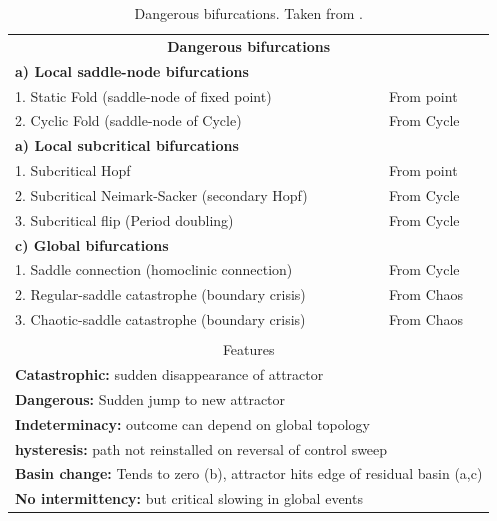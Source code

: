 \begin{table}[H]
				\centering
	\begin{tabular}{ll}
		\hline
		\multicolumn{2}{c}{\textbf{Dangerous bifurcations}} \\
		\textbf{a) Local saddle-node bifurcations} & \\
		1. Static Fold (saddle-node of fixed point) & From point\\
		2. Cyclic Fold (saddle-node of Cycle) & From Cycle\\				
		\textbf{a) Local subcritical bifurcations} & \\
		1. Subcritical Hopf  & From point\\
		2. Subcritical Neimark-Sacker (secondary Hopf)  & From Cycle\\		
		3. Subcritical flip (Period doubling)  & From Cycle\\				
		\textbf{c) Global bifurcations} & \\
		1. Saddle connection (homoclinic connection) &  From Cycle\\
		2. Regular-saddle catastrophe (boundary crisis) &  From Chaos\\
		3. Chaotic-saddle catastrophe (boundary crisis) &  From Chaos\\
		& \\
		\multicolumn{2}{c}{Features}	\\
		\multicolumn{2}{l}{\textbf{Catastrophic:} sudden disappearance of attractor}\\
		\multicolumn{2}{l}{	\textbf{Dangerous:} Sudden jump to new attractor }	\\
		\multicolumn{2}{l}{	\textbf{Indeterminacy:} outcome can depend on global topology}	\\
		\multicolumn{2}{l}{	\textbf{hysteresis:} path not reinstalled on reversal of control sweep}	\\
		\multicolumn{2}{l}{	\textbf{Basin change:} Tends to zero (b), attractor hits edge of residual basin (a,c)}\\
		\multicolumn{2}{l}{	\textbf{No intermittency:} but critical slowing in global events}	\\   
		\hline
	\end{tabular}
	\caption{Dangerous bifurcations. Taken from \cite{Thompson2011a}. }
	\label{tab:dangerous_bifs}
\end{table}



